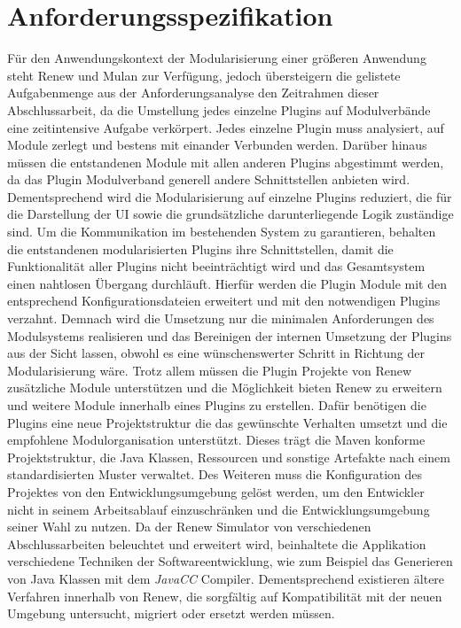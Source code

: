 \section{Anforderungsspezifikation} %
	Für den Anwendungskontext der Modularisierung einer größeren Anwendung steht Renew und Mulan zur Verfügung, jedoch übersteigern die gelistete Aufgabenmenge  aus der Anforderungsanalyse den Zeitrahmen dieser Abschlussarbeit, da die Umstellung jedes einzelne Plugins auf Modulverbände eine zeitintensive Aufgabe verkörpert. Jedes einzelne Plugin muss analysiert, auf Module zerlegt und bestens mit einander Verbunden werden. Darüber hinaus müssen die entstandenen Module mit allen anderen Plugins abgestimmt werden, da das Plugin Modulverband generell andere Schnittstellen anbieten wird. Dementsprechend wird die Modularisierung auf einzelne Plugins reduziert, die für die Darstellung der UI sowie die grundsätzliche darunterliegende Logik zuständige sind. Um die Kommunikation im bestehenden System zu garantieren, behalten die entstandenen modularisierten Plugins ihre Schnittstellen, damit die Funktionalität aller Plugins nicht beeinträchtigt wird und das Gesamtsystem einen nahtlosen Übergang durchläuft. Hierfür werden die Plugin Module mit den entsprechend Konfigurationsdateien erweitert und mit den notwendigen Plugins verzahnt. Demnach wird die Umsetzung nur die minimalen Anforderungen des Modulsystems realisieren und das Bereinigen der internen Umsetzung der Plugins aus der Sicht lassen, obwohl es eine wünschenswerter Schritt in Richtung der Modularisierung wäre. \newline 
	Trotz allem müssen die Plugin Projekte von Renew zusätzliche Module unterstützen und die Möglichkeit bieten Renew zu erweitern und weitere Module innerhalb eines Plugins zu erstellen. Dafür benötigen die Plugins eine neue Projektstruktur die das gewünschte Verhalten umsetzt und die empfohlene Modulorganisation unterstützt. Dieses trägt die Maven konforme Projektstruktur, die Java Klassen, Ressourcen und sonstige Artefakte nach einem standardisierten Muster verwaltet. Des Weiteren muss die Konfiguration des Projektes von den Entwicklungsumgebung gelöst werden, um den Entwickler nicht in seinem Arbeitsablauf einzuschränken und die Entwicklungsumgebung seiner Wahl zu nutzen. \newline
	Da der Renew Simulator von verschiedenen Abschlussarbeiten beleuchtet und erweitert wird, beinhaltete die Applikation verschiedene Techniken der Softwareentwicklung, wie zum Beispiel das Generieren von Java Klassen mit dem \textit{JavaCC} Compiler. Dementsprechend existieren ältere Verfahren innerhalb von Renew, die sorgfältig auf Kompatibilität mit der neuen Umgebung untersucht, migriert oder ersetzt werden müssen. \bigbreak

